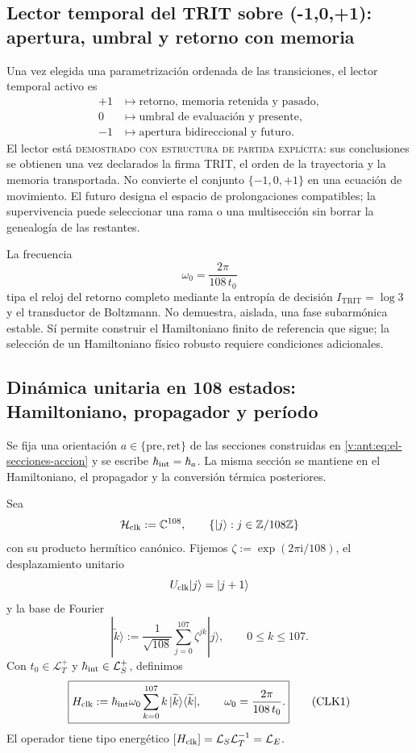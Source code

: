 \subsection{Lector temporal del TRIT sobre ({-1,0,+1}): apertura, umbral y retorno con memoria}
\label{v:rec:sec:lector-temporal-trit}

Una vez elegida una parametrización ordenada de las transiciones, el lector
temporal activo es
\[
\begin{aligned}
 +1&\longmapsto
 \text{retorno, memoria retenida y pasado},\\
 0&\longmapsto
 \text{umbral de evaluación y presente},\\
 -1&\longmapsto
 \text{apertura bidireccional y futuro}.
\end{aligned}
\]
El lector está \textsc{demostrado con estructura de partida explícita}: sus
conclusiones se obtienen una vez declarados la firma TRIT, el orden de la
trayectoria y la memoria transportada. No convierte el conjunto
\(\{-1,0,+1\}\) en una ecuación de movimiento. El futuro designa el espacio
de prolongaciones compatibles; la supervivencia puede seleccionar una rama
o una multisección sin borrar la genealogía de las restantes.

La frecuencia
\[
 \omega_0=\frac{2\pi}{108\,t_0}
\]
tipa el reloj del retorno completo mediante la entropía de decisión
\(I_{\mathrm{TRIT}}=\log 3\) y el transductor de Boltzmann.
No demuestra, aislada, una fase subarmónica estable. Sí permite construir el
Hamiltoniano finito de referencia que sigue; la selección de un Hamiltoniano
físico robusto requiere condiciones adicionales.

\subsection{Dinámica unitaria en 108 estados: Hamiltoniano, propagador y período}
\label{v:rec:sec:hamiltoniano-reloj-108}

Se fija una orientación \(a\in\{\mathrm{pre},\mathrm{ret}\}\) de las
secciones construidas en \eqref{v:ant:eq:el-secciones-accion} y se escribe
\(\hbar_{\rm int}=\hbar_a\). La misma sección se mantiene en el
Hamiltoniano, el propagador y la conversión térmica posteriores.

Sea
\[
 \mathcal H_{\rm clk}:=\mathbb C^{108},
 \qquad
 \{|j\rangle:j\in\mathbb Z/108\mathbb Z\}
\]
con su producto hermítico canónico. Fijemos
\(\zeta:=\exp(2\pi\mathrm i/108)\), el desplazamiento unitario
\[
 U_{\rm clk}|j\rangle=|j+1\rangle
\]
y la base de Fourier
\[
 |\widetilde k\rangle
 :=\frac1{\sqrt{108}}\sum_{j=0}^{107}\zeta^{jk}|j\rangle,
 \qquad 0\leq k\leq107.
\]
Con \(t_0\in\mathcal L_T^+\) y
\(\hbar_{\rm int}\in\mathcal L_S^+\), definimos
\[
 \boxed{
 H_{\rm clk}
 :=\hbar_{\rm int}\omega_0
 \sum_{k=0}^{107}k\,
 |\widetilde k\rangle\langle\widetilde k|,
 \qquad
 \omega_0=\frac{2\pi}{108\,t_0}.}
 \tag{CLK1}\label{v:rec:eq:hamiltoniano-reloj-108}
\]
El operador tiene tipo energético
\([H_{\rm clk}]=\mathcal L_S\mathcal L_T^{-1}=\mathcal L_E\).

